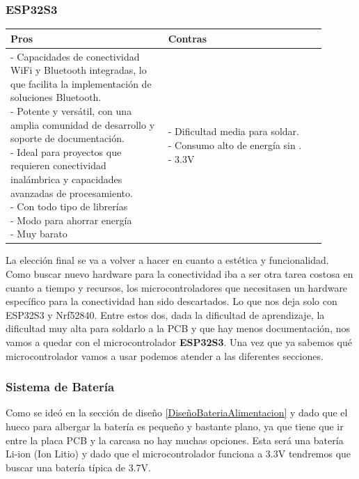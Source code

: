 \subsubsection{ESP32S3}
\begin{table}[H]
\centering
\small
\begin{tabular}{|p{0.45\linewidth}|p{0.45\linewidth}|}
\hline
\textbf{Pros} &
\textbf{Contras} \\
\hline
\parbox[t]{\linewidth}{
\vspace{0.1cm}
- Capacidades de conectividad \gls{WiFi} y \gls{Bluetooth} integradas, lo que facilita la implementación de soluciones \gls{Bluetooth}. \bigskip \\
- Potente y versátil, con una amplia comunidad de desarrollo y soporte de documentación. \bigskip \\
- Ideal para proyectos que requieren conectividad inalámbrica y capacidades avanzadas de procesamiento. \bigskip \\
- Con todo tipo de librerías \bigskip \\
- Modo  para ahorrar energía \bigskip \\
- Muy barato \vspace{0.1cm}
} &
\parbox[t]{\linewidth}{
\vspace{0.1cm}
- Dificultad media para soldar. \bigskip \\
- Consumo alto de energía sin . \bigskip \\
- 3.3V } \bigskip \\
\hline
\end{tabular}
\end{table}

La elección final se va a volver a hacer en cuanto a estética y funcionalidad. Como buscar nuevo hardware para la conectividad  iba a ser otra tarea costosa en cuanto a tiempo y recursos, los microcontroladores que necesitasen un hardware específico para la conectividad han sido descartados.
Lo que nos deja solo con ESP32S3 y Nrf52840. Entre estos dos, dada la dificultad de aprendizaje, la dificultad muy alta para soldarlo a la \gls{PCB} y que hay menos documentación, nos vamos a quedar con el microcontrolador \textbf{ESP32S3}. Una vez que ya sabemos qué microcontrolador vamos a usar podemos atender a las diferentes secciones.

\subsubsection{Sistema de Batería} \label{InvestigacionSistemaBateria}
Como se ideó en la sección de diseño \ref{DiseñoBateriaAlimentacion} y dado que el hueco para albergar la batería es pequeño y bastante plano, ya que tiene que ir entre la placa \gls{PCB} y la carcasa no hay muchas opciones. Esta será una batería Li-ion (Ion Litio) y dado que el microcontrolador funciona a 3.3V tendremos que buscar una batería típica de 3.7V.


